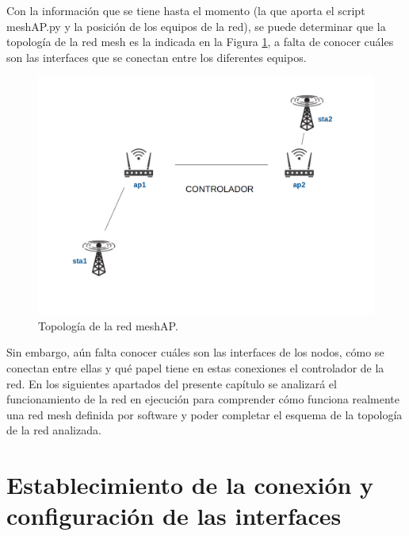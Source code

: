 \documentclass[a4paper,12pt,twoside,spanish]{book}
\begin{document}
Con la información que se tiene hasta el momento (la que aporta el script meshAP.py y la posición de los equipos de la red), se puede determinar que la topología de la red mesh es la indicada en la Figura \ref{fig:topo_inicial}, a falta de conocer cuáles son las interfaces que se conectan entre los diferentes equipos.\par

	\begin{figure}[!h]
		\centering
		\includegraphics[scale=.5]{Figuras/topo_inicial.png}
		\caption{Topología de la red meshAP.}
		\label{fig:topo_inicial}
	\end{figure}

Sin embargo, aún falta conocer cuáles son las interfaces de los nodos, cómo se conectan entre ellas y qué papel tiene en estas conexiones el controlador de la red. En los siguientes apartados del presente capítulo se analizará el funcionamiento de la red en ejecución para comprender cómo funciona realmente una red mesh definida por software y poder completar el esquema de la topología de la red analizada.\par







\section{Establecimiento de la conexión y configuración de las interfaces}
\end{document}

